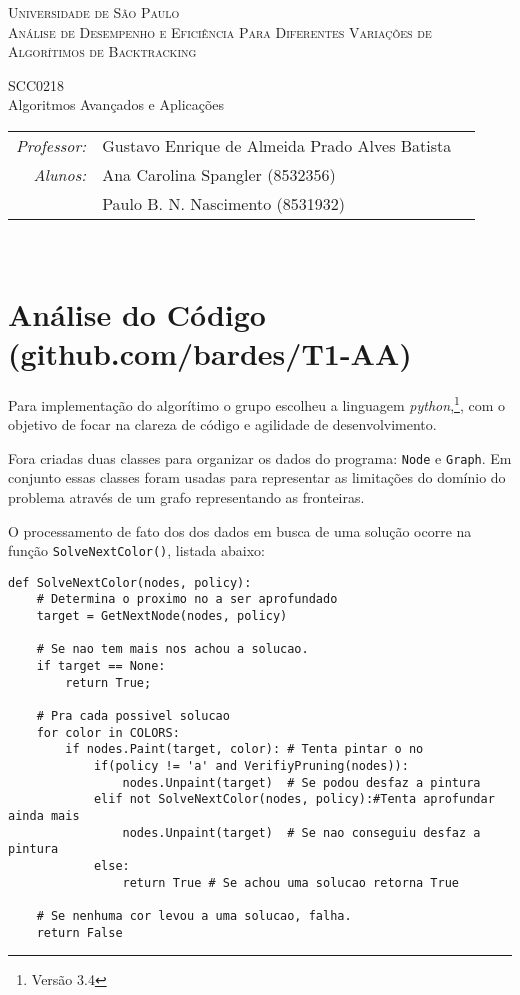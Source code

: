 \documentclass[11pt,towside]{article}
\begin{document}
\begin{titlepage}
\begin{center}

\textsc{\Huge Universidade de São Paulo}\\[5mm]
\textsc{\Large Análise de Desempenho e Eficiência Para Diferentes Variações de Algorítimos de Backtracking}

\vfill
{\Huge SCC0218 \\[2mm] Algoritmos Avançados e Aplicações}
\vfill

\begin{tabular}{rll}
\emph{Professor:}& {\Large Gustavo Enrique de Almeida Prado Alves Batista} \\[5mm]
\emph{Alunos:}& {\Large Ana Carolina Spangler} (8532356) \\[2mm]
& {\Large Paulo B. N. Nascimento} (8531932)
\end{tabular}\\[25mm]

\end{center}
\end{titlepage}

\section{Análise do Código (github.com/bardes/T1-AA)}
Para implementação do algorítimo o grupo escolheu a linguagem \emph{python},\footnote{Versão 3.4}, com o objetivo de focar na clareza de código e agilidade de desenvolvimento.

Fora criadas duas classes para organizar os dados do programa: \texttt{Node} e \texttt{Graph}. Em conjunto essas classes foram usadas para representar as limitações do domínio do problema através de um grafo representando as fronteiras.

O processamento de fato dos dos dados em busca de uma solução ocorre na função \texttt{SolveNextColor()}, listada abaixo:

\begin{lstlisting}
def SolveNextColor(nodes, policy):
    # Determina o proximo no a ser aprofundado
    target = GetNextNode(nodes, policy)

    # Se nao tem mais nos achou a solucao.
    if target == None:
        return True;

    # Pra cada possivel solucao
    for color in COLORS:
        if nodes.Paint(target, color): # Tenta pintar o no
            if(policy != 'a' and VerifiyPruning(nodes)):
                nodes.Unpaint(target)  # Se podou desfaz a pintura
            elif not SolveNextColor(nodes, policy):#Tenta aprofundar ainda mais
                nodes.Unpaint(target)  # Se nao conseguiu desfaz a pintura
            else:
                return True # Se achou uma solucao retorna True

    # Se nenhuma cor levou a uma solucao, falha.
    return False
\end{lstlisting}
\end{document}
